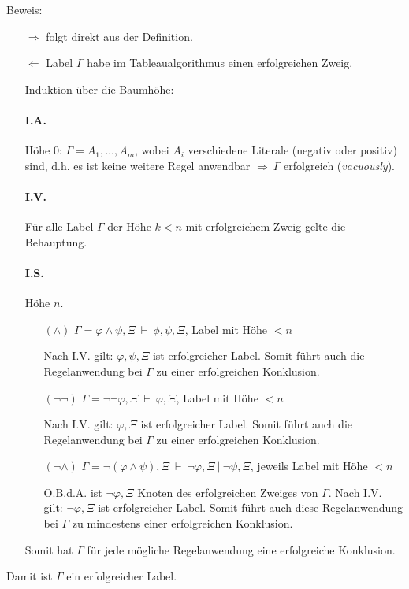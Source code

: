 Beweis:
\begin{itemize}
    \item [\glqq$\Rightarrow$\grqq] folgt direkt aus der Definition.
    \item [\glqq$\Leftarrow$\grqq] Label $\Gamma$ habe im Tableaualgorithmus einen erfolgreichen Zweig.

        Induktion über die Baumhöhe:
        \paragraph{I.A.} Höhe 0: $\Gamma = A_1, \dots, A_m$, wobei $A_i$ verschiedene Literale (negativ oder positiv)
        sind, d.h. es ist keine weitere Regel anwendbar $\Rightarrow \ \Gamma$ erfolgreich (\emph{vacuously}).
        \paragraph{I.V.} Für alle Label $\Gamma$ der Höhe $k < n$ mit erfolgreichem Zweig gelte die Behauptung.
        \paragraph{I.S.} Höhe $n$.
        \begin{itemize}
            \item[$(\wedge)$] $\Gamma = \varphi \wedge \psi, \Xi \ \vdash \ \phi, \psi, \Xi$, Label mit Höhe $< n$

                Nach I.V. gilt: $\varphi, \psi, \Xi$ ist erfolgreicher Label. Somit führt auch die Regelanwendung bei
                $\Gamma$ zu einer erfolgreichen Konklusion.
            \item[$(\neg\neg)$] $\Gamma = \neg \neg \varphi, \Xi \ \vdash \ \varphi, \Xi$, Label mit Höhe $< n$

                Nach I.V. gilt: $\varphi, \Xi$ ist erfolgreicher Label. Somit führt auch
                die Regelanwendung bei $\Gamma$ zu einer erfolgreichen Konklusion.
            \item[$(\neg\wedge)$] $\Gamma = \neg (\varphi \wedge \psi), \Xi \ \vdash \ \neg \varphi, \Xi \ | \ \neg
                \psi, \Xi$, jeweils Label mit Höhe $< n$

                O.B.d.A. ist $\neg \varphi, \Xi$ Knoten des erfolgreichen Zweiges von $\Gamma$. Nach I.V. gilt: $\neg
                \varphi, \Xi$ ist erfolgreicher Label. Somit führt auch diese Regelanwendung bei $\Gamma$ zu mindestens
                einer erfolgreichen Konklusion.
        \end{itemize}
        Somit hat $\Gamma$ für jede mögliche Regelanwendung eine erfolgreiche Konklusion.
\end{itemize}
Damit ist $\Gamma$ ein erfolgreicher Label.

